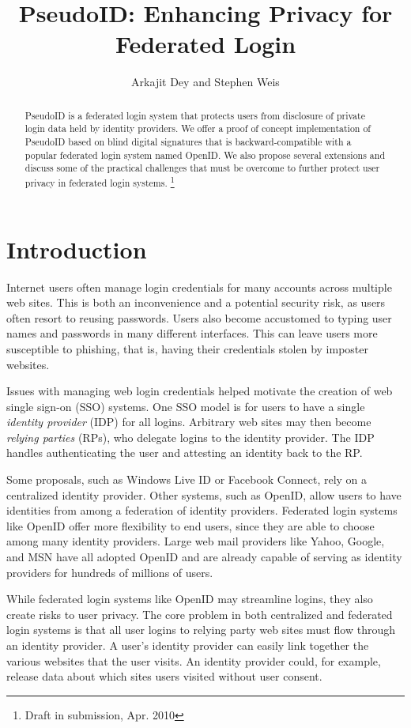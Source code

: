 \documentclass[11pt]{llncs}
\title{PseudoID: Enhancing Privacy for Federated Login}
\author{Arkajit Dey\inst{1} and Stephen Weis\inst{2}}
\institute{Massachusetts Institute of Technology, Cambridge, MA, USA 02139
\and
Google Inc., Mountain View, CA, USA 94043}
\begin{document}
\maketitle

\begin{abstract}
  PseudoID is a federated login system that protects users from
  disclosure of private login data held by identity providers. We
  offer a proof of concept implementation of PseudoID based on blind
  digital signatures that is backward-compatible with a popular
  federated login system named OpenID. We also propose several
  extensions and discuss some of the practical challenges that must be
  overcome to further protect user privacy in federated login systems.
  \footnote{Draft in submission, Apr. 2010}
\end{abstract}

\section{Introduction}
\label{sec:intro}

Internet users often manage login credentials for many accounts across
multiple web sites. This is both an inconvenience and a potential
security risk, as users often resort to reusing passwords. Users also
become accustomed to typing user names and passwords in many different
interfaces. This can leave users more susceptible to phishing, that
is, having their credentials stolen by imposter websites.

Issues with managing web login credentials helped motivate the
creation of web single sign-on (SSO) systems. One SSO model is for
users to have a single \emph{identity provider} (IDP) for all
logins. Arbitrary web sites may then become \emph{relying parties}
(RPs), who delegate logins to the identity provider. The IDP handles
authenticating the user and attesting an identity back to the RP.

Some proposals, such as Windows Live ID or Facebook Connect, rely on a
centralized identity provider. Other systems, such as OpenID, allow
users to have identities from among a federation of identity
providers. Federated login systems like OpenID offer more flexibility
to end users, since they are able to choose among many identity
providers. Large web mail providers like Yahoo, Google, and MSN have
all adopted OpenID \cite{Yah08,Sac08,WLOP08} and are already capable
of serving as identity providers for hundreds of millions of users.

While federated login systems like OpenID may streamline logins, they
also create risks to user privacy. The core problem in both centralized
and federated login systems is that all user logins to relying party
web sites must flow through an identity provider. A user's identity
provider can easily link together the various websites that the user
visits. An identity provider could, for example, release data about
which sites users visited without user consent.
\end{document}
